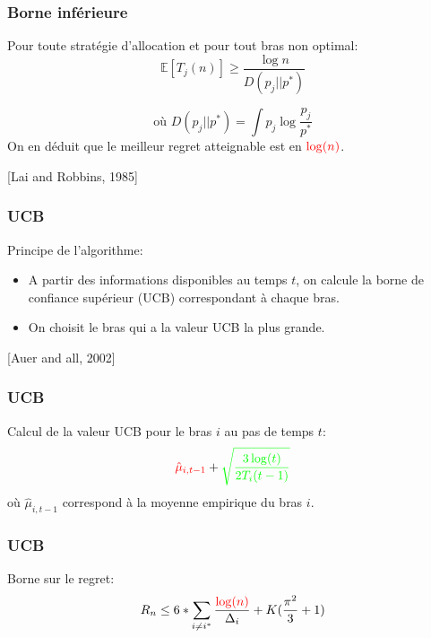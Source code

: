 \documentclass[compress, color = usenames, dvipsnames]{beamer}
\begin{document}
\begin{frame}
    \frametitle{Borne inférieure}


    Pour toute stratégie d'allocation et pour tout bras non optimal:
    $$\mathbb{E} [T_j(n)] \ge \frac{\log n}{D(p_j || p^*)}$$

    $$\mbox{où }D(p_j || p^*) = \int p_j \log \frac{p_j}{p^*}$$
    On en déduit que le meilleur regret atteignable est en ${\color{red} \log(n)}$.

    \hfill [Lai and Robbins, 1985]

\end{frame}



\begin{frame}
    \frametitle{UCB}
    Principe de l'algorithme:
    \begin{itemize}
        \item A partir des informations disponibles au temps $t$, on calcule la borne de confiance supérieur (UCB) correspondant à chaque bras.
        \item On choisit le bras qui a la valeur UCB la plus grande.
    \end{itemize}
    \hfill [Auer and all, 2002]
\end{frame}

\begin{frame}
    \frametitle{UCB}
    Calcul de la valeur UCB pour le bras $i$ au pas de temps $t$:
    $$ {\color{red} \hat{\mu}_{i,t-1}} + {\color{green} \sqrt{\frac{3\log(t)}{2T_i(t-1)}}} $$
    où $\hat{\mu}_{i,t-1} $ correspond à la moyenne empirique du bras $i$.
    
\end{frame}

\begin{frame}
    \frametitle{UCB}
    Borne sur le regret:
    $$ R_n \le 6*\sum_{i \ne i^*}\frac{\color{red}\log(n)}{\Delta_i} + K(\frac{\pi^2}{3}+1) $$
    
\end{frame}
\end{document}
